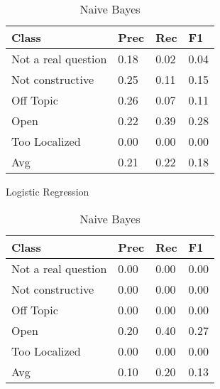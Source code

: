 \begin{table}[!htpb]
\centering
\begin{minipage}{.5\linewidth}
    \begin{tabular}{|l|l|l|l|} \hline
    \textbf{Class}& \textbf{Prec} & \textbf{Rec} & \textbf{F1} \\ \hline
    Not a real question & 0.18      & 0.02   & 0.04     \\
    Not constructive    & 0.25      & 0.11   & 0.15     \\
    Off Topic           & 0.26      & 0.07   & 0.11     \\
    Open                & 0.22      & 0.39   & 0.28     \\
    Too Localized       & 0.00      & 0.00   & 0.00     \\ \hline
    Avg                 & 0.21      & 0.22   & 0.18   \\ \hline  
    \end{tabular}
    \caption{Logistic Regression}
    \label{tab2:lr}
\end{minipage}%
\begin{minipage}{.5\linewidth}
    \begin{tabular}{|l|l|l|l|} \hline
    \textbf{Class}& \textbf{Prec} & \textbf{Rec} & \textbf{F1} \\ \hline
    Not a real question & 0.00      & 0.00   & 0.00     \\
    Not constructive    & 0.00      & 0.00   & 0.00     \\
    Off Topic           & 0.00      & 0.00   & 0.00     \\
    Open                & 0.20      & 0.40   & 0.27     \\
    Too Localized       & 0.00      & 0.00   & 0.00     \\ \hline
    Avg                 & 0.10      & 0.20   & 0.13   \\ \hline  
    \end{tabular}
    \caption{Naive Bayes}
    \label{tab2:nb}
\end{minipage}
\end{table}


